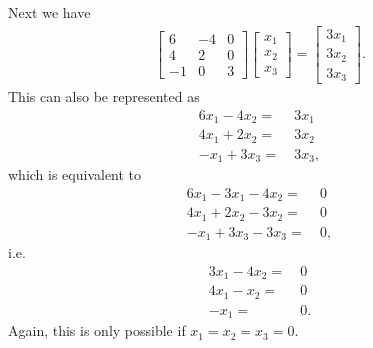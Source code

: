 \documentclass[12pt]{article}
\begin{document}
\begin{enumerate}
      Next we have
      \begin{align*}
        \begin{bmatrix}
          6 & -4 & 0\\
          4 &  2 & 0\\
         -1 &  0 & 3
        \end{bmatrix}
        \begin{bmatrix}
          x_1 \\
          x_2 \\
          x_3
        \end{bmatrix}
        =
        \begin{bmatrix}
          3x_1 \\
          3x_2 \\
          3x_3
        \end{bmatrix}.
      \end{align*}
      This can also be represented as
      \begin{align*}
        6x_1 - 4x_2 =&\ 3x_1\\
        4x_1 + 2x_2 =&\ 3x_2\\
        -x_1 + 3x_3 =&\ 3x_3,
      \end{align*}
      which is equivalent to
      \begin{align*}
        6x_1 - 3x_1 - 4x_2 =&\ 0\\
        4x_1 + 2x_2 - 3x_2 =&\ 0\\
        -x_1 + 3x_3 - 3x_3 =&\ 0,
      \end{align*}
      i.e.
      \begin{align*}
        3x_1 - 4x_2 =&\ 0\\
        4x_1 -  x_2 =&\ 0\\
        -x_1        =&\ 0.
      \end{align*}
      Again, this is only possible if $x_1 = x_2 = x_3 = 0$.

\end{enumerate}
\end{document}
